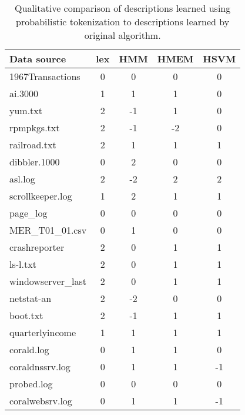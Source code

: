 \begin{table}[th]
\begin{center}
\begin{tabular}{|l||c|c|c|c|}\hline
Data source & lex & HMM & HMEM & HSVM \\ \hline 1967Transactions &
0& 0 & 0 & 0   \\\hline ai.3000 & 1 &
1 & 1 & 0 \\ \hline yum.txt & 2 &  -1 & 1 & 0 \\
\hline rpmpkgs.txt & 2 & -1 & -2 & 0 \\ \hline railroad.txt & 2 & 1
& 1 & 1
\\ \hline dibbler.1000 & 0 & 2 & 0 & 0   \\ \hline asl.log & 2 & -2
& 2 & 2 \\ \hline scrollkeeper.log  &  1 & 2 & 1 & 1 \\
\hline page\_log  & 0 & 0 & 0 & 0 \\
\hline MER\_T01\_01.csv & 0 & 1 & 0 & 0 \\ \hline crashreporter & 2
& 0 & 1 & 1 \\ \hline ls-l.txt & 2 & 0 & 1 & 1 \\
\hline windowserver\_last & 2 & 0 & 1 & 1 \\ \hline netstat-an & 2 &
-2 & 0 & 0 \\ \hline boot.txt & 2 & -1 & 1 & 1 \\
\hline quarterlyincome & 1 & 1 & 1 & 1   \\
\hline corald.log & 0 & 1 & 1 & 0
\\ \hline coraldnssrv.log  & 0 &  1 & 1 & -1 \\ \hline probed.log & 0 & 0 & 0 & 0 \\ \hline coralwebsrv.log &
0 & 1 & 1 & -1 \\\hline
\end{tabular}
\caption{Qualitative comparison of descriptions learned using
probabilistic
  tokenization to descriptions learned by original \learnpads{}
  algorithm.}
\label{tab:expert}
\end{center}
\end{table}

